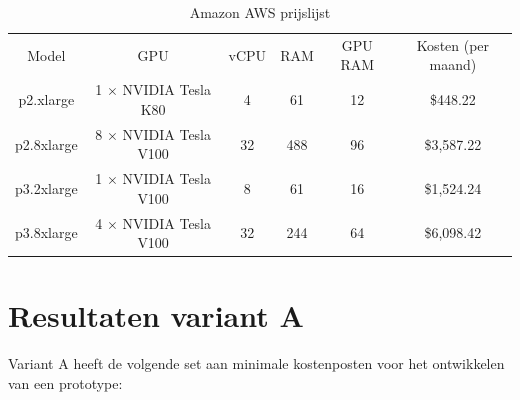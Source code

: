 \begin{table}[H]
    \centering
    \begin{tabular}{c||c|c|c|c|c}
        Model & GPU & vCPU & RAM & GPU RAM & Kosten (per maand) \\
        p2.xlarge & 1 $\times$ NVIDIA Tesla K80 & 4 & 61 & 12 & \$448.22  \\
        p2.8xlarge & 8 $\times$ NVIDIA Tesla V100 & 32 & 488 & 96 & \$3,587.22  \\
        p3.2xlarge & 1 $\times$ NVIDIA Tesla V100 & 8 & 61 & 16 & \$1,524.24 \\
        p3.8xlarge & 4 $\times$ NVIDIA Tesla V100 & 32 & 244 & 64 & \$6,098.42  \\
    \end{tabular}
    \caption{Amazon AWS prijslijst}
    \label{tab:aws_prices}
\end{table}




\section{Resultaten variant A}
Variant A heeft de volgende set aan minimale kostenposten voor het ontwikkelen van een prototype:

